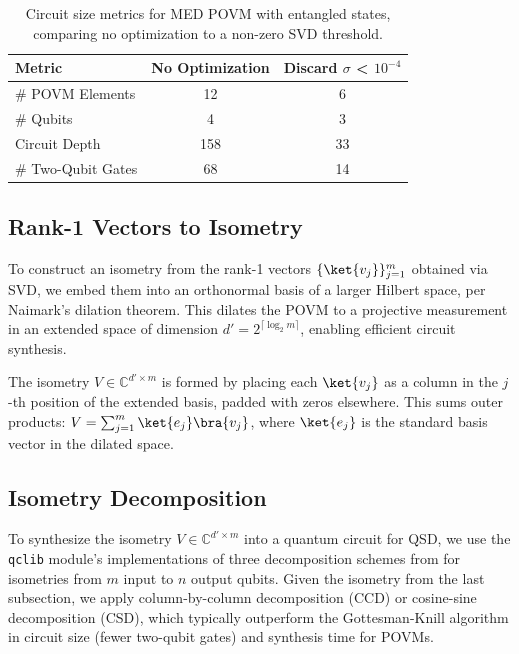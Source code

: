 \begin{table}[ht]
    \centering
    \caption{Circuit size metrics for MED POVM with entangled states, comparing no optimization to a non-zero SVD threshold.}
    \label{tab:med_circuit_size}
    \begin{tabular}{l c c}
        \hline
        \textbf{Metric}    & \textbf{No Optimization} & \textbf{Discard $\sigma$ < \(10^{-4}\)} \\
        \hline
        \# POVM Elements   & 12                       & 6                                       \\
        \# Qubits          & 4                        & 3                                       \\
        Circuit Depth      & 158                      & 33                                      \\
        \# Two-Qubit Gates & 68                       & 14                                      \\
        \hline
    \end{tabular}
\end{table}

\subsection{Rank-1 Vectors to Isometry}
To construct an isometry from the rank-1 vectors \(\{ \ket{v_j} \}_{j=1}^m\)
obtained via SVD, we embed them into an orthonormal basis of a larger Hilbert
space, per Naimark's dilation theorem.
This dilates the POVM to a projective measurement in an extended space of
dimension \(d' = 2^{\lceil \log_2 m \rceil}\), enabling efficient circuit synthesis.

The isometry \(V \in \mathbb{C}^{d' \times m}\) is formed by placing each
\(\ket{v_j}\) as a column in the \(j\)-th position of the extended basis,
padded with zeros elsewhere.
This sums outer products: \(V = \sum_{j=1}^m \ket{e_j} \bra{v_j}\), where
\(\ket{e_j}\) is the standard basis vector in the dilated space.

\subsection{Isometry Decomposition}
To synthesize the isometry \(V \in \mathbb{C}^{d' \times m}\) into a quantum
circuit for QSD, we use the \texttt{qclib} \cite{qclib} module’s
implementations of three decomposition schemes from \cite{RN12} for isometries
from \(m\) input to \(n\) output qubits.
Given the isometry from the last subsection, we apply
column-by-column decomposition (CCD) or cosine-sine decomposition (CSD),
which typically outperform the Gottesman-Knill algorithm in circuit size
(fewer two-qubit gates) and synthesis time for POVMs.

